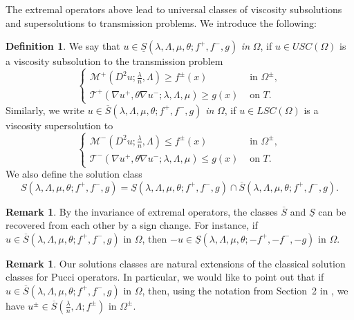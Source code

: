 \documentclass[letter,11pt]{amsart}
\newcommand{\mcal}{\mathcal{M}}
\newcommand{\tcal}{\mathcal{T}}
\newcommand{\uppers}{USC}
\newcommand{\lowers}{LSC}
\theoremstyle{definition}
\newtheorem{defn}[thm]{Definition}
\newtheorem{rem}[thm]{Remark}
\numberwithin{equation}{section}
\begin{document}
\medskip


The extremal operators above lead to universal classes of viscosity subsolutions and supersolutions to transmission problems. 
We introduce the following:

\begin{defn}
We say that $u \in \underline{S}(\lambda,\Lambda,\mu,\theta; f^{+}, f^{-}, g)$\emph{ in }$\Omega$, if $u \in \uppers(\Omega)$ is a viscosity subsolution to the transmission problem
\[
\begin{cases}
\mcal^{+}(D^2 u; \frac{\lambda}{n}, \Lambda) \geq f^{\pm}(x) & \text{ in } \Omega^{\pm},\\
\tcal^{+}(\nabla u^{+}, \theta \nabla u^{-}; \lambda,\Lambda,\mu) \geq g(x) & \text{ on } T.
\end{cases}
\]
Similarly, we write $u \in \overline{S}(\lambda,\Lambda,\mu,\theta; f^{+}, f^{-}, g)$\emph{ in }$\Omega$, if $u \in \lowers(\Omega)$ is a viscosity supersolution to
\[
\begin{cases}
\mcal^{-}(D^2 u; \frac{\lambda}{n}, \Lambda) \leq f^{\pm}(x) & \text{ in } \Omega^{\pm},\\
\tcal^{-}(\nabla u^{+}, \theta \nabla u^{-}; \lambda,\Lambda,\mu) \leq g(x) & \text{ on } T.
\end{cases}
\]
We also define the solution class
\[
S(\lambda,\Lambda,\mu,\theta; f^{+}, f^{-}, g) = \underline{S}(\lambda,\Lambda,\mu,\theta; f^{+}, f^{-}, g) \cap \overline{S}(\lambda,\Lambda,\mu,\theta; f^{+}, f^{-}, g).
\]
\end{defn}

\begin{rem}
By the invariance of extremal operators, the classes $\overline{S}$ and $\underline{S}$ can be recovered from each other by a sign change.
For instance, if $u \in \overline{S}(\lambda, \Lambda, \mu, \theta; f^{+}, f^{-}, g)$ in $\Omega$, then $-u \in \underline{S}(\lambda, \Lambda, \mu, \theta; -f^{+}, -f^{-}, -g)$ in $\Omega$.
\end{rem}

\begin{rem}
Our solutions classes are natural extensions of the classical solution classes for Pucci operators.
In particular, we would like to point out that if $u \in \overline{S}(\lambda, \Lambda, \mu, \theta; f^{+}, f^{-}, g)$ in $\Omega$, 
then, using the notation from Section~2 in \cite{CC}, we have $u^{\pm} \in \overline{S}(\frac{\lambda}{n}, \Lambda; f^{\pm})$ in $\Omega^{\pm}$.
\end{rem}
\end{document}
